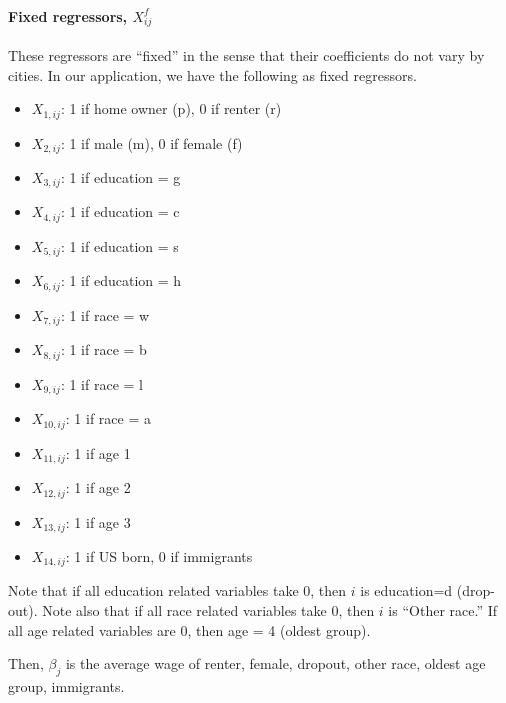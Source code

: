 \documentclass[11pt]{article}
\begin{document}
\paragraph{Fixed regressors, $X_{ij}^{f}$}These regressors are ``fixed'' in the sense that their coefficients do not vary by cities. In our application, we have the following as fixed regressors.
\begin{itemize}
\item $X_{1,ij}$: 1 if home owner (p), 0 if renter (r) 
\item $X_{2,ij}$: 1 if male (m), 0 if female (f)
\item $X_{3,ij}$: 1 if education = g
\item $X_{4,ij}$: 1 if education = c
\item $X_{5,ij}$: 1 if education = s
\item $X_{6,ij}$: 1 if education = h
\item $X_{7,ij}$: 1 if race = w
\item $X_{8,ij}$: 1 if race = b
\item $X_{9,ij}$: 1 if race = l
\item $X_{10,ij}$: 1 if race = a
\item $X_{11,ij}$: 1 if age 1
\item $X_{12,ij}$: 1 if age 2
\item $X_{13,ij}$: 1 if age 3
\item $X_{14,ij}$: 1 if US born, 0 if immigrants
\end{itemize}
Note that if all education related variables take 0, then $i$ is education=d (drop-out). Note also that if all race related variables take 0, then $i$ is ``Other race.'' If all age related variables are 0, then age = 4 (oldest group). 

Then, $\beta_{j}$ is the average wage of renter, female, dropout, other race, oldest age group, immigrants. 
\end{document}
